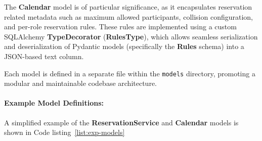 The \textbf{Calendar} model is of particular significance, as it encapsulates reservation related metadata such as maximum allowed participants, collision configuration, and per-role reservation rules. These rules are implemented using a custom SQLAlchemy \textbf{TypeDecorator} (\textbf{RulesType}), which allows seamless serialization and deserialization of Pydantic models (specifically the \textbf{Rules} schema) into a JSON-based text column.

Each model is defined in a separate file within the \texttt{models} directory, promoting a modular and maintainable codebase architecture.

\paragraph{Example Model Definitions:}
A simplified example of the \textbf{ReservationService} and \textbf{Calendar} models is shown in Code listing~\ref{list:exp-models}

